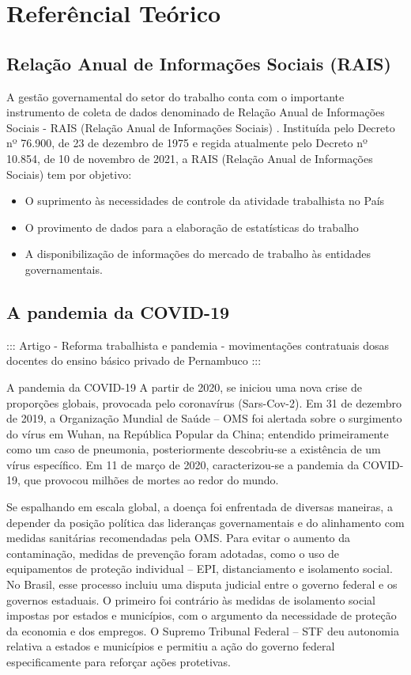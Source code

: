 \section{Referêncial Teórico}

\subsection{Relação Anual de Informações Sociais (RAIS)}

A gestão governamental do setor do trabalho conta com o importante instrumento de coleta de dados denominado de Relação Anual de Informações Sociais - RAIS (Relação Anual de Informações Sociais) \cite{Sobre_a_RAIS}. Instituída pelo Decreto nº 76.900, de 23 de dezembro de 1975 e regida atualmente pelo Decreto nº 10.854, de 10 de novembro de 2021, a RAIS (Relação Anual de Informações Sociais) tem por objetivo: 

\begin{itemize}
	\item O suprimento às necessidades de controle da atividade trabalhista no País
	\item O provimento de dados para a elaboração de estatísticas do trabalho
	\item A disponibilização de informações do mercado de trabalho às entidades governamentais.
\end{itemize}

\subsection{A pandemia da COVID-19}

::: Artigo - Reforma trabalhista e pandemia -  movimentações contratuais dosas docentes do ensino básico privado de Pernambuco :::

A pandemia da COVID-19 A partir de 2020, se iniciou uma nova crise de proporções globais, provocada pelo coronavírus (Sars-Cov-2). Em 31 de dezembro de 2019, a Organização Mundial de Saúde – OMS foi alertada sobre o surgimento do vírus em Wuhan, na República Popular da China; entendido primeiramente como um caso de pneumonia, posteriormente descobriu-se a existência de um vírus específico. Em 11 de março de 2020, caracterizou-se a pandemia da COVID-19, que provocou milhões de mortes ao redor do mundo. 

Se espalhando em escala global, a doença foi enfrentada de diversas maneiras, a depender da posição política das lideranças governamentais e do alinhamento com medidas sanitárias recomendadas pela OMS. Para evitar o aumento da contaminação, medidas de prevenção foram adotadas, como o uso de equipamentos de proteção individual – EPI, distanciamento e isolamento social. No Brasil, esse processo incluiu uma disputa judicial entre o governo federal e os governos estaduais. O primeiro foi contrário às medidas de isolamento social impostas por estados e municípios, com o argumento da necessidade de proteção da economia e dos empregos. O Supremo Tribunal Federal – STF deu autonomia relativa a estados e municípios e permitiu a ação do governo federal especificamente para reforçar ações protetivas.

